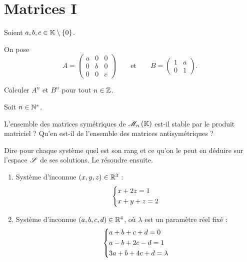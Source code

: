 \chapter{Matrices I}

\minitoc

\begin{exo}
Soient \(a,b,c\in\mathbb{K}\setminus\left\lbrace0\right\rbrace\).

On pose \[A=\begin{pmatrix}
a & 0 & 0 \\
0 & b & 0 \\
0 & 0 & c
\end{pmatrix}\qquad\text{et}\qquad B=\begin{pmatrix}
1 & a \\
0 & 1
\end{pmatrix}.\]

Calculer \(A^n\) et \(B^n\) pour tout \(n\in\mathbb{Z}\).
\end{exo}

\begin{corr}
\end{corr}

\begin{exo}
Soit \(n\in\mathbb{N}^*\).

L'ensemble des matrices symétriques de \(\M{n}\) est-il stable par le produit matriciel ? Qu'en est-il de l'ensemble des matrices antisymétriques ?
\end{exo}

\begin{corr}
\end{corr}

\begin{exo}
Dire pour chaque système quel est son rang et ce qu'on le peut en déduire sur l'espace \(\mathscr{S}\) de ses solutions. Le résoudre ensuite.

\begin{enumerate}
\item Système d'inconnue \(\left(x,y,z\right)\in\mathbb{R}^3\) : \[\begin{dcases}
x+2z=1 \\
x+y+z=2
\end{dcases}\]

\item Système d'inconnue \(\left(a,b,c,d\right)\in\mathbb{R}^4\), où \(\lambda\) est un paramètre réel fixé : \[\begin{dcases}
a+b+c+d=0 \\
a-b+2c-d=1 \\
3a+b+4c+d=\lambda
\end{dcases}\]
\end{enumerate}
\end{exo}

